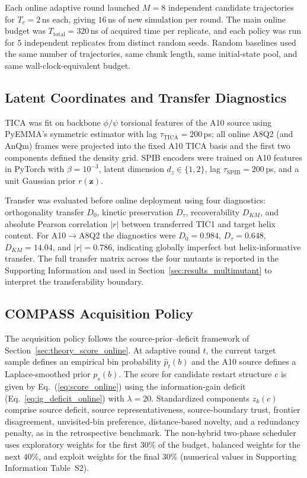 \documentclass[journal=jctcce,manuscript=article,layout=twocolumn]{achemso}
\begin{document}
Each online adaptive round launched $M=8$ independent candidate trajectories for $T_c=2$\,ns each, giving $16$\,ns of new simulation per round. The main online budget was $T_{\mathrm{total}}=320$\,ns of acquired time per replicate, and each policy was run for $5$ independent replicates from distinct random seeds. Random baselines used the same number of trajectories, same chunk length, same initial-state pool, and same wall-clock-equivalent budget.

\subsection{Latent Coordinates and Transfer Diagnostics}

TICA was fit on backbone $\phi/\psi$ torsional features of the A10 source using PyEMMA's symmetric estimator with lag $\tau_{\mathrm{TICA}}=200$\,ps;\cite{perezhernandez2013tica,scherer2015pyemma} all online A8Q2 (and AnQm) frames were projected into the fixed A10 TICA basis and the first two components defined the density grid. SPIB encoders were trained on A10 features in PyTorch with $\beta=10^{-3}$, latent dimension $d_z\in\{1,2\}$, lag $\tau_{\mathrm{SPIB}}=200$\,ps, and a unit Gaussian prior $r(\mathbf{z})$.\cite{wang2021spib}

Transfer was evaluated before online deployment using four diagnostics: orthogonality transfer $D_0$, kinetic preservation $D_\tau$, recoverability $D_{KM}$, and absolute Pearson correlation $|r|$ between transferred TIC1 and target helix content. For A10$\to$A8Q2 the diagnostics were $D_0=0.984$, $D_\tau=0.648$, $D_{KM}=14.04$, and $|r|=0.786$, indicating globally imperfect but helix-informative transfer. The full transfer matrix across the four mutants is reported in the Supporting Information and used in Section~\ref{sec:results_multimutant} to interpret the transferability boundary.

\subsection{COMPASS Acquisition Policy}

The acquisition policy follows the source-prior--deficit framework of Section~\ref{sec:theory_score_online}. At adaptive round $t$, the current target sample defines an empirical bin probability $\hat{p}_t(b)$ and the A10 source defines a Laplace-smoothed prior $p_s(b)$. The score for candidate restart structure $c$ is given by Eq.~(\ref{eq:score_online}) using the information-gain deficit (Eq.~\ref{eq:ig_deficit_online}) with $\lambda=20$. Standardized components $z_k(c)$ comprise source deficit, source representativeness, source-boundary trust, frontier disagreement, unvisited-bin preference, distance-based novelty, and a redundancy penalty, as in the retrospective benchmark. The non-hybrid two-phase scheduler uses exploratory weights for the first $30\%$ of the budget, balanced weights for the next $40\%$, and exploit weights for the final $30\%$ (numerical values in Supporting Information Table~S2).
\end{document}
